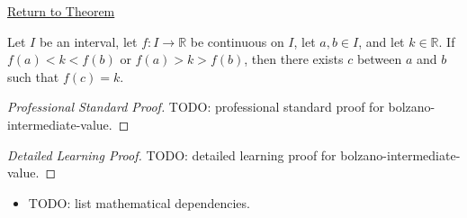 \newpage
{}
\label{prf:bolzano-intermediate-value}

\begin{remark*}[Return]
\hyperref[thm:bolzano-intermediate-value]{Return to Theorem}
\end{remark*}

\begin{theorem*}
Let $I$ be an interval, let $f : I \to \mathbb{R}$ be continuous on $I$, let $a, b \in I$, and let $k \in \mathbb{R}$. If $f(a) < k < f(b)$ or $f(a) > k > f(b)$, then there exists $c$ between $a$ and $b$ such that $f(c) = k$.
\end{theorem*}

\begin{proof}[Professional Standard Proof]
\LRAProofBodyStart
TODO: professional standard proof for bolzano-intermediate-value.
\end{proof}

\begin{proof}[Detailed Learning Proof]
\LRAProofBodyStart
TODO: detailed learning proof for bolzano-intermediate-value.
\end{proof}

\begin{remark*}
\end{remark*}

\begin{dependencies}
\begin{itemize}
  \item TODO: list mathematical dependencies.
\end{itemize}
\end{dependencies}

\clearpage
